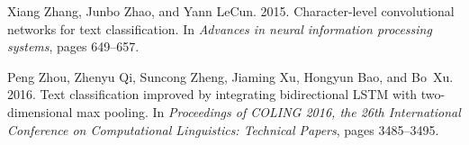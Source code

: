 \documentclass[11pt,a4paper]{article}
\begin{document}
\begin{thebibliography}{40}
Xiang Zhang, Junbo Zhao, and Yann LeCun. 2015.
\newblock Character-level convolutional networks for text classification.
\newblock In \emph{Advances in neural information processing systems}, pages
  649--657.

Peng Zhou, Zhenyu Qi, Suncong Zheng, Jiaming Xu, Hongyun Bao, and Bo~Xu. 2016.
\newblock Text classification improved by integrating bidirectional {LSTM} with
  two-dimensional max pooling.
\newblock In \emph{Proceedings of COLING 2016, the 26th International
  Conference on Computational Linguistics: Technical Papers}, pages 3485--3495.

\end{thebibliography}
\end{document}
